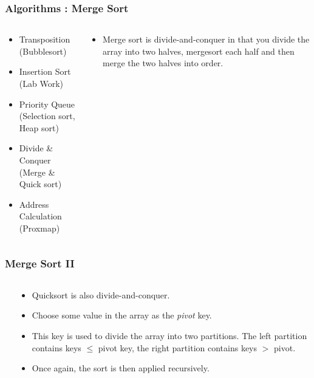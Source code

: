 \begin{frame}[fragile]
\frametitle{Algorithms : Merge Sort}
\begin{columns}[T]

\begin{column}{0.35\textwidth}
\begin{itemize}[<+->]
\item Transposition (Bubblesort)
\item Insertion Sort (Lab Work)
\item Priority Queue (Selection sort, Heap sort)
\item Divide \& Conquer (Merge \& Quick sort)
\item Address Calculation (Proxmap)
\end{itemize}
\end{column}

\pause
\begin{column}{0.55\textwidth}
\begin{itemize}[<+->]
\item Merge sort is divide-and-conquer in that you
divide the array into two halves, mergesort each half and
then merge the two halves into order.
\end{itemize}
\pause

\end{column}

\end{columns}
\end{frame}


\begin{frame}[fragile]
\frametitle{Merge Sort II}
\begin{columns}[T]

\begin{column}{0.50\textwidth}

\end{column}

\pause
\begin{column}{0.40\textwidth}
\begin{itemize}[<+->]
\item Quicksort is also divide-and-conquer.
\item Choose some value in the array as the {\it pivot} key.
\item This key is used to divide the array into two partitions.
The left partition contains keys
$\leq$ pivot key, the right partition contains keys $>$ pivot.
\item Once again, the sort is then applied recursively.
\end{itemize}
\end{column}

\end{columns}
\end{frame}

